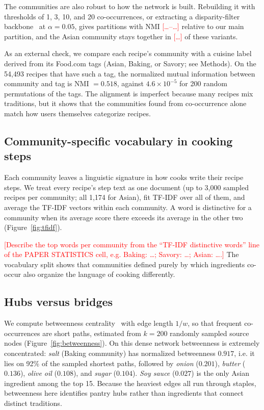 \documentclass[9pt,twocolumn]{pnas-new}
\newcommand{\tbd}[1]{\textcolor{red}{[#1]}}
\begin{document}
The communities are also robust to how the network is built. Rebuilding it with thresholds of 1, 3, 10, and 20 co-occurrences, or extracting a disparity-filter backbone~\cite{serrano2009extracting} at $\alpha = 0.05$, gives partitions with NMI \tbd{\ldots--\ldots} relative to our main partition, and the Asian community stays together in \tbd{\ldots} of these variants.

As an external check, we compare each recipe's community with a cuisine label derived from its Food.com tags (Asian, Baking, or Savory; see Methods). On the 54,493 recipes that have such a tag, the normalized mutual information between community and tag is NMI $= 0.518$, against $4.6 \times 10^{-5}$ for 200 random permutations of the tags. The alignment is imperfect because many recipes mix traditions, but it shows that the communities found from co-occurrence alone match how users themselves categorize recipes.

\subsection*{Community-specific vocabulary in cooking steps}

Each community leaves a linguistic signature in how cooks write their recipe steps. We treat every recipe's step text as one document (up to 3,000 sampled recipes per community; all 1,174 for Asian), fit TF-IDF over all of them, and average the TF-IDF vectors within each community. A word is distinctive for a community when its average score there exceeds its average in the other two (Figure~\ref{fig:tfidf}).

\tbd{Describe the top words per community from the ``TF-IDF distinctive words'' line of the PAPER STATISTICS cell, e.g. Baking: \ldots; Savory: \ldots; Asian: \ldots.} The vocabulary split shows that communities defined purely by which ingredients co-occur also organize the language of cooking differently.

\subsection*{Hubs versus bridges}

We compute betweenness centrality~\cite{brandes2001faster} with edge length $1/w$, so that frequent co-occurrences are short paths, estimated from $k = 200$ randomly sampled source nodes (Figure~\ref{fig:betweenness}). On this dense network betweenness is extremely concentrated: \textit{salt} (Baking community) has normalized betweenness $0.917$, i.e. it lies on 92\% of the sampled shortest paths, followed by \textit{onion} ($0.201$), \textit{butter} ($0.136$), \textit{olive oil} ($0.108$), and \textit{sugar} ($0.104$). \textit{Soy sauce} ($0.027$) is the only Asian ingredient among the top 15. Because the heaviest edges all run through staples, betweenness here identifies pantry hubs rather than ingredients that connect distinct traditions.
\end{document}
